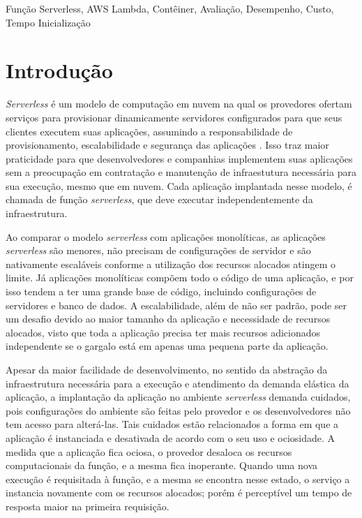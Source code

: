 \documentclass[conference]{IEEEtran}
\begin{document}
\begin{IEEEkeywords}
Função Serverless, AWS Lambda, Contêiner, Avaliação, Desempenho, Custo, Tempo Inicialização
\end{IEEEkeywords}


\section{Introdução}
\label{sec:Intro}

\textit{Serverless} é um modelo de computação em nuvem na qual os provedores ofertam serviços para provisionar  dinamicamente servidores configurados para que seus clientes executem suas aplicações, assumindo a responsabilidade de provisionamento, escalabilidade e segurança das aplicações \cite{Nupponen_2020_serverless_what_it_is}.
Isso traz maior praticidade para que desenvolvedores e companhias implementem suas aplicações sem a preocupação em contratação e manutenção de infraestutura necessária para sua execução, mesmo que em nuvem. 
Cada aplicação implantada nesse modelo, é chamada de função \textit{serverless}, que deve executar independentemente da infraestrutura.

Ao comparar o modelo \textit{serverless} com aplicações monolíticas, as aplicações \textit{serverless} são menores, não precisam de configurações de servidor e são nativamente escaláveis conforme a utilização dos recursos alocados atingem o limite. Já aplicações monolíticas compõem todo o código de uma aplicação, e por isso tendem a ter uma grande base de código, incluindo configurações de servidores e banco de dados. A escalabilidade, além de não ser padrão, pode ser um desafio devido ao maior tamanho da aplicação e necessidade de recursos alocados, visto que toda a aplicação precisa ter mais recursos adicionados independente se o gargalo está em apenas uma pequena parte da aplicação.

Apesar da maior facilidade de desenvolvimento, no sentido da abstração da infraestrutura necessária para a execução e atendimento da demanda elástica da aplicação, a implantação da aplicação no ambiente \textit{serverless} demanda cuidados, pois configurações do ambiente são feitas pelo provedor e os desenvolvedores não tem acesso para alterá-las. Tais cuidados estão relacionados a forma em que a aplicação é instanciada e desativada de acordo com o seu uso e ociosidade. A medida que a aplicação fica ociosa, o provedor desaloca os recursos computacionais da função, e a mesma fica inoperante. Quando uma nova execução é requisitada à função, e a mesma se encontra nesse estado, o serviço a instancia novamente com os recursos alocados; porém é perceptível um tempo de resposta maior na primeira requisição.   
\end{document}
